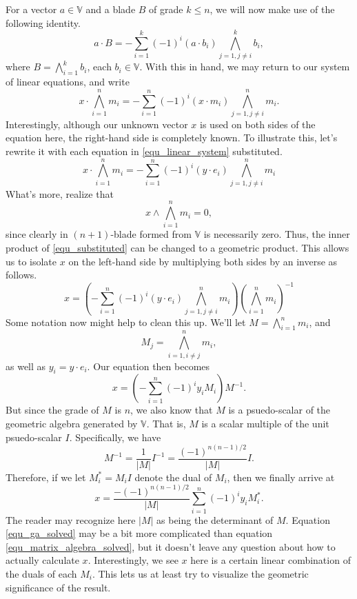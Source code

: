 \documentclass[12pt]{article}
\newcommand{\V}{\mathbb{V}}
\begin{document}
For a vector $a\in\V$ and a blade $B$ of grade $k\leq n$, we will now make use of the following identity.
\begin{equation}
a\cdot B = -\sum_{i=1}^k(-1)^i (a\cdot b_i) \bigwedge_{j=1,j\neq i}^k b_i,
\end{equation}
where $B=\bigwedge_{i=1}^k b_i$, each $b_i\in\V$.  With this in hand, we may return to our
system of linear equations, and write
\begin{equation}
x\cdot\bigwedge_{i=1}^n m_i = -\sum_{i=1}^n (-1)^i (x\cdot m_i)\bigwedge_{j=1,j\neq i}^n m_i.
\end{equation}
Interestingly, although our unknown vector $x$ is used on both sides of the equation here, the right-hand side
is completely known.  To illustrate this, let's rewrite it with each equation in \eqref{equ_linear_system} substituted.
\begin{equation}\label{equ_substituted}
x\cdot\bigwedge_{i=1}^n m_i = -\sum_{i=1}^n (-1)^i (y\cdot e_i)\bigwedge_{j=1,j\neq i}^n m_i
\end{equation}
What's more, realize that
\begin{equation}
x\wedge\bigwedge_{i=1}^n m_i = 0,
\end{equation}
since clearly in $(n+1)$-blade formed from $\V$ is necessarily zero.  Thus, the inner product of \eqref{equ_substituted}
can be changed to a geometric product.  This allows us to isolate $x$ on the left-hand side by multiplying both sides
by an inverse as follows.
\begin{equation}
x = \left(-\sum_{i=1}^n (-1)^i (y\cdot e_i)\bigwedge_{j=1,j\neq i}^n m_i\right)\left(\bigwedge_{i=1}^n m_i\right)^{-1}
\end{equation}
Some notation now might help to clean this up.  We'll let $M=\bigwedge_{i=1}^n m_i$, and
\begin{equation}
M_j=\bigwedge_{i=1,i\neq j}^n m_i,
\end{equation}
as well as $y_i=y\cdot e_i$.  Our equation then becomes
\begin{equation}
x = \left(-\sum_{i=1}^n(-1)^i y_i M_i\right)M^{-1}.
\end{equation}
But since the grade of $M$ is $n$, we also know that $M$ is a psuedo-scalar of the geometric algebra generated by $\V$.
That is, $M$ is a scalar multiple of the unit psuedo-scalar $I$.  Specifically, we have
\begin{equation}
M^{-1} = \frac{1}{|M|}I^{-1} = \frac{(-1)^{n(n-1)/2}}{|M|}I.
\end{equation}
Therefore, if we let $M_i^{*}=M_iI$ denote the dual of $M_i$, then we finally arrive at
\begin{equation}\label{equ_ga_solved}
x = \frac{-(-1)^{n(n-1)/2}}{|M|}\sum_{i=1}^n (-1)^i y_i M_i^{*}.
\end{equation}
The reader may recognize here $|M|$ as being the determinant of $M$.  Equation \eqref{equ_ga_solved}
may be a bit more complicated than equation \eqref{equ_matrix_algebra_solved}, but it doesn't leave
any question about how to actually calculate $x$.  Interestingly, we see $x$ here is a certain linear
combination of the duals of each $M_i$.  This lets us at least try to visualize the geometric significance
of the result.
\end{document}
